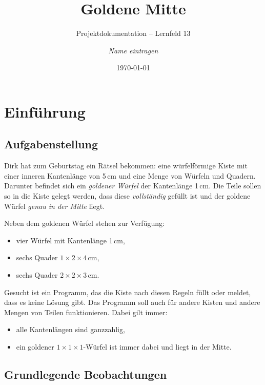 \documentclass[11pt,a4paper,parskip=half]{scrartcl}
\title{Goldene Mitte}
\subtitle{Projektdokumentation -- Lernfeld 13}
\author{\textit{Name eintragen}}
\date{\today}
\begin{document}
\maketitle
\tableofcontents
\newpage

\section{Einführung}

\subsection{Aufgabenstellung}

Dirk hat zum Geburtstag ein Rätsel bekommen: eine würfelförmige Kiste mit einer
inneren Kantenlänge von 5\,cm und eine Menge von Würfeln und Quadern. Darunter
befindet sich ein \emph{goldener Würfel} der Kantenlänge 1\,cm. Die Teile sollen
so in die Kiste gelegt werden, dass diese \emph{vollständig} gefüllt ist und der
goldene Würfel \emph{genau in der Mitte} liegt.

Neben dem goldenen Würfel stehen zur Verfügung:
\begin{itemize}
  \item vier Würfel mit Kantenlänge 1\,cm,
  \item sechs Quader $1 \times 2 \times 4$\,cm,
  \item sechs Quader $2 \times 2 \times 3$\,cm.
\end{itemize}

Gesucht ist ein Programm, das die Kiste nach diesen Regeln füllt oder meldet, dass es
keine Lösung gibt. Das Programm soll auch für andere Kisten und andere Mengen von
Teilen funktionieren. Dabei gilt immer:
\begin{itemize}
  \item alle Kantenlängen sind ganzzahlig,
  \item ein goldener $1\times1\times1$-Würfel ist immer dabei und liegt in der Mitte.
\end{itemize}

\subsection{Grundlegende Beobachtungen}
\end{document}
